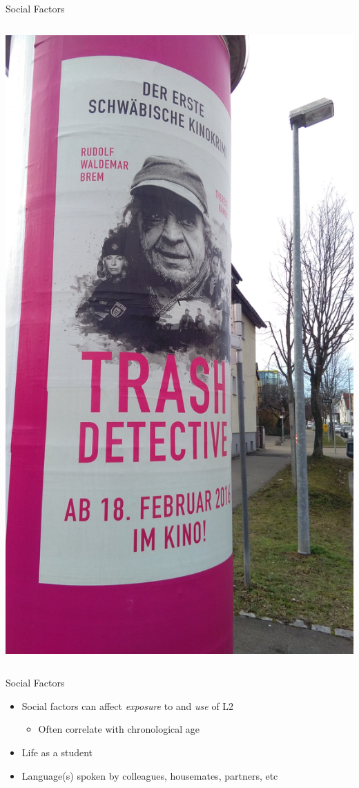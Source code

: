 \documentclass{beamer}
\begin{document}
\begin{frame}{Social Factors}
\begin{columns}
      \includegraphics[scale=0.05]{trash_detective.jpg}
  \end{columns}
\end{frame}

\begin{frame}{Social Factors}
  \begin{itemize}
    \item Social factors can affect \emph{exposure} to and \emph{use} of L2
    \begin{itemize}
      \item Often correlate with chronological age
    \end{itemize}
    \item Life as a student
    \item Language(s) spoken by colleagues, housemates, partners, etc
  \end{itemize}
\end{frame}
\end{document}
